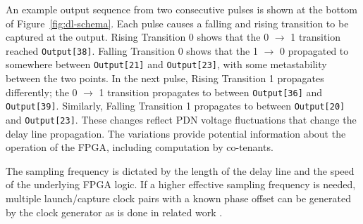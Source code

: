 An example output sequence from two consecutive pulses is shown at the bottom of Figure~\ref{fig:dl-schema}.
Each pulse causes a falling and rising transition to be captured at the output.
Rising Transition 0 shows that the 0 $\rightarrow$ 1 transition reached \texttt{Output[38]}. Falling Transition 0 shows that the 1 $\rightarrow$ 0 propagated to somewhere between \texttt{Output[21]} and \texttt{Output[23]}, with some metastability between the two points.
In the next pulse, Rising Transition 1 propagates differently; the 0 $\rightarrow$ 1 transition propagates to between \texttt{Output[36]} and \texttt{Output[39]}.
Similarly, Falling Transition 1 propagates to between \texttt{Output[20]} and \texttt{Output[23]}.
These changes reflect PDN voltage fluctuations that change the delay line propagation.
The variations provide potential information about the operation of the FPGA, including computation by co-tenants.

The sampling frequency is dictated by the length of the delay line and the speed of the underlying FPGA logic.
If a higher effective sampling frequency is needed, multiple launch/capture clock pairs with a known phase offset can be generated by the clock generator as is done in related work \cite{song20208, choi2020design, wang2016256}.



